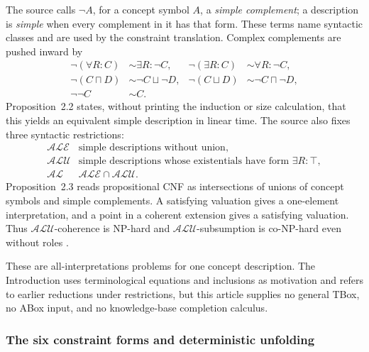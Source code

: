 The source calls \(\neg A\), for a concept symbol \(A\), a \emph{simple
complement}; a description is \emph{simple} when every complement in it has
that form.  These terms name syntactic classes and are used by the constraint
translation.  Complex complements are pushed inward by
\[
\begin{aligned}
 \neg(\forall R:C)&\sim\exists R:\neg C,&
 \neg(\exists R:C)&\sim\forall R:\neg C,\\
 \neg(C\sqcap D)&\sim\neg C\sqcup\neg D,&
 \neg(C\sqcup D)&\sim\neg C\sqcap\neg D,\\
 \neg\neg C&\sim C.
\end{aligned}
\]
Proposition~2.2 states, without printing the induction or size calculation,
that this yields an equivalent simple description in linear time.  The source
also fixes three syntactic restrictions:
\[
\begin{array}{c|l}
 \mathcal{ALE}&\text{simple descriptions without union},\\
 \mathcal{ALU}&\text{simple descriptions whose existentials have form }
                       \exists R:\top,\\
 \mathcal{AL}&\mathcal{ALE}\cap\mathcal{ALU}.
\end{array}
\]
Proposition~2.3 reads propositional CNF as intersections of unions of concept
symbols and simple complements.  A satisfying valuation gives a one-element
interpretation, and a point in a coherent extension gives a satisfying
valuation.  Thus \(\mathcal{ALU}\)-coherence is NP-hard and
\(\mathcal{ALU}\)-subsumption is co-NP-hard even without roles
\cite[\S2, pp.~6--7]{SchmidtSchaussSmolka1991}.

These are all-interpretations problems for one concept description.  The
Introduction uses terminological equations and inclusions as motivation and
refers to earlier reductions under restrictions, but this article supplies no
general TBox, no ABox input, and no knowledge-base completion calculus.

\subsubsection{The six constraint forms and deterministic unfolding}

